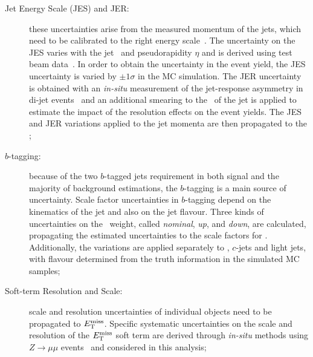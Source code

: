 			\begin{description}
				\item [Jet Energy Scale (JES) and \ac{JER}:] these uncertainties arise from the measured momentum of the jets, which need to be calibrated to the right energy scale~\cite{ATLAS13TeVJES}. The uncertainty on the \ac{JES} varies with the jet \pt\ and pseudorapidity $\eta$ and is derived using test beam data~\cite{Aad:1409965}. %
				In order to obtain the uncertainty in the event yield, the \ac{JES} uncertainty is varied by $\pm 1 \sigma$ in the MC simulation. The \ac{JER} uncertainty is obtained with an \emph{in-situ} measurement of the jet-response asymmetry in di-jet events~\cite{ATLAS2010JER} and an additional smearing to the \pt\ of the jet is applied to estimate the impact of the resolution effects on the event yields. The \ac{JES} and \ac{JER} variations applied to the jet momenta are then propagated to the \met; 



				\item [$b$-tagging:] because of the two $b$-tagged jets requirement in both signal and the majority of background estimations, the $b$-tagging is a main source of uncertainty. Scale factor uncertainties in $b$-tagging depend on the kinematics of the jet and also on the jet flavour. Three kinds of uncertainties on the \bj\ weight, called \emph{nominal}, \emph{up}, and \emph{down}, are calculated, propagating the estimated uncertainties to the scale factors for \bjs. Additionally, the variations are applied separately to \bjs, $c$-jets and light jets, with flavour determined from the truth information in the simulated \ac{MC} samples; 

				\item[\boldmath \met Soft-term Resolution and Scale:] scale and resolution uncertainties of individual objects need to be propagated to $E_{\mathrm{T}}^{\mathrm{miss}}$. Specific systematic uncertainties on the scale and resolution of the $E_{\mathrm{T}}^{\mathrm{miss}}$ soft term are derived through \emph{in-situ} methods using $Z \rightarrow \mu\mu$ events~\cite{ATLASMet2015} and considered in this analysis;


\end{description}
